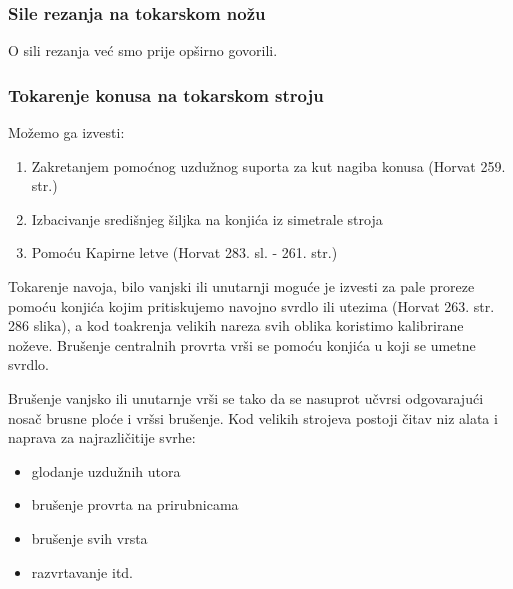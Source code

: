 \documentclass[a4paper,12pt]{article}
\numberwithin{figure}{section}
\begin{document}
\subsubsection{Sile rezanja na tokarskom nožu}
O sili rezanja već smo prije opširno govorili.
\subsubsection{Tokarenje konusa na tokarskom stroju}
Možemo ga izvesti:
\begin{enumerate}
\item Zakretanjem pomoćnog uzdužnog suporta za kut nagiba konusa (Horvat 259. str.)
\item Izbacivanje središnjeg šiljka na konjića iz simetrale stroja
\item Pomoću Kapirne letve (Horvat 283. sl. - 261. str.)
\end{enumerate}
Tokarenje navoja, bilo vanjski ili unutarnji moguće je izvesti za pale proreze pomoću konjića kojim pritiskujemo navojno svrdlo ili utezima (Horvat 263. str. 286 slika), a kod toakrenja velikih nareza svih oblika koristimo kalibrirane noževe. Brušenje centralnih provrta vrši se pomoću konjića u koji se umetne svrdlo.\par
Brušenje vanjsko ili unutarnje vrši se tako da se nasuprot učvrsi odgovarajući nosač brusne ploće i vršsi brušenje. Kod velikih strojeva postoji čitav niz alata i naprava za najrazličitije svrhe:
\begin{itemize}
\item glodanje uzdužnih utora
\item brušenje provrta na prirubnicama
\item brušenje svih vrsta
\item razvrtavanje itd.
\end{itemize}
\end{document}
